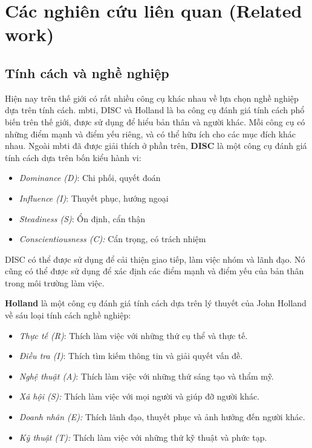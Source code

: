 \section{Các nghiên cứu liên quan (Related work)} 

\subsection{Tính cách và nghề nghiệp}
Hiện nay trên thế giới có rất nhiều công cụ khác nhau về lựa chọn nghề nghiệp dựa trên tính cách. \acrshort{mbti}, DISC và Holland là ba công cụ đánh giá tính cách phổ biến trên thế giới, được sử dụng để hiểu bản thân và người khác. Mỗi công cụ có những điểm mạnh và điểm yếu riêng, và có thể hữu ích cho các mục đích khác nhau. Ngoài \acrshort{mbti} đã được giải thích ở phần trên, \textbf{DISC} là một công cụ đánh giá tính cách dựa trên bốn kiểu hành vi:
\begin{itemize}
    \item \textit{Dominance (D)}: Chi phối, quyết đoán
    \item \textit{Influence (I)}: Thuyết phục, hướng ngoại
    \item \textit{Steadiness (S)}: Ổn định, cẩn thận
    \item \textit{Conscientiousness (C):} Cẩn trọng, có trách nhiệm
\end{itemize}

DISC có thể được sử dụng để cải thiện giao tiếp, làm việc nhóm và lãnh đạo. Nó cũng có thể được sử dụng để xác định các điểm mạnh và điểm yếu của bản thân trong môi trường làm việc.

\textbf{Holland} là một công cụ đánh giá tính cách dựa trên lý thuyết của John Holland về sáu loại tính cách nghề nghiệp:
\begin{itemize}
    \item \textit{Thực tế (R)}: Thích làm việc với những thứ cụ thể và thực tế.
    \item \textit{Điều tra (I)}: Thích tìm kiếm thông tin và giải quyết vấn đề.
    \item \textit{Nghệ thuật (A)}: Thích làm việc với những thứ sáng tạo và thẩm mỹ.
    \item \textit{Xã hội (S):} Thích làm việc với mọi người và giúp đỡ người khác.
    \item \textit{Doanh nhân (E):} Thích lãnh đạo, thuyết phục và ảnh hưởng đến người khác.
    \item \textit{Kỹ thuật (T):} Thích làm việc với những thứ kỹ thuật và phức tạp.
\end{itemize}

